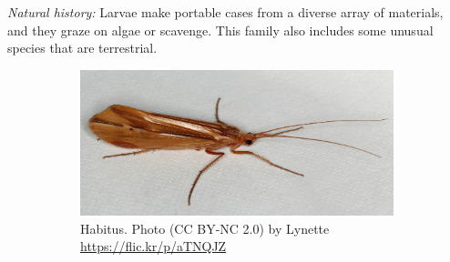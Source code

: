 \documentclass[letterpaper, 11pt]{article}
\begin{document}
\noindent{}\textit{Natural history:} Larvae make portable cases from a diverse array of materials, and they graze on algae or scavenge. This family also includes some unusual species that are terrestrial.\\

\begin{figure}[ht!]
    \centering
    \begin{subfigure}[ht!]{0.68\textwidth}
        \includegraphics[width=\textwidth]{TrichoImage02}
        \caption{Habitus. Photo (CC BY-NC 2.0) by Lynette \url{https://flic.kr/p/aTNQJZ}}
        \label{fig:limnephilid1}
    \end{subfigure}
    \hfill %
    \begin{subfigure}[ht!]{0.15\textwidth}

\end{subfigure}
\end{figure}
\end{document}

